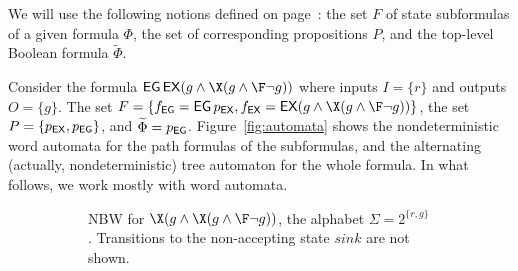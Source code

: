 We will use the following notions defined on page~\pageref{page:defs:bottom-up-mc}:
the set $F$ of state subformulas of a given \CTLstar formula $\Phi$,
the set of corresponding propositions $P$,
and the top-level Boolean formula $\widetilde\Phi$.

\begin{example}
Consider the formula $\EG\EX(g \land \X(g \land \F\neg g))$
where inputs $I=\{r\}$ and outputs $O=\{g\}$.
The set $F=\{ f_{\EG}=\EG p_{\EX}, f_{\EX}=\EX(g \land \X(g \land \F\neg g)) \}$,
the set $P=\{ p_{\operatorname{\mathsf{EX}}}, p_{\operatorname{\mathsf{EG}}} \}$, and
$\widetilde\Phi=p_{\operatorname{\mathsf{EG}}}$.
Figure~\ref{fig:automata} shows the nondeterministic word automata for the path formulas of the subformulas,
and the alternating (actually, nondeterministic) tree automaton for the whole formula.
In what follows, we work mostly with word automata.

\begin{figure}[tb]
\begin{subfigure}[t]{\linewidth}\center
{}
\caption{%
  NBW for $\X (g \land \X (g \land \F\neg g))$,
  the alphabet $\Sigma=2^{\{r,g\}}$.
  Transitions to the non-accepting state $sink$ are not shown.}
\label{fig:nbw-x}
\end{subfigure}
\begin{subfigure}[t]{\linewidth}\center
{}
\end{subfigure}
\end{figure}
\end{example}
